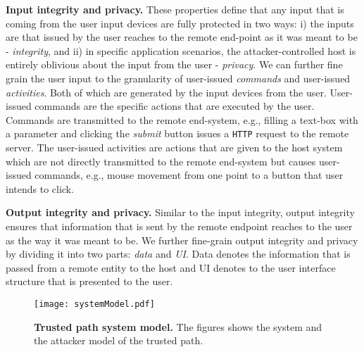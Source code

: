 \begin{mylist}
  \item \textbf{Input integrity and privacy.} These properties define that any input that is coming from the user input devices are fully protected in two ways: i) the inputs are that issued by the user reaches to the remote end-point as it was meant to be - \emph{integrity}, and ii) in specific application scenarios, the attacker-controlled host is entirely oblivious about the input from the user - \emph{privacy}. We can further fine grain the user input to the granularity of user-issued \emph{commands} and user-issued \emph{activities}. Both of which are generated by the input devices from the user. User-issued commands are the specific actions that are executed by the user. Commands are transmitted to the remote end-system, e.g., filling a text-box with a parameter and clicking the \emph{submit} button issues a \texttt{HTTP} request to the remote server. The user-issued activities are actions that are given to the host system which are not directly transmitted to the remote end-system but causes user-issued commands, e.g., mouse movement from one point to a button that user intends to click.  
  
  \item \textbf{Output integrity and privacy.} Similar to the input integrity, output integrity ensures that information that is sent by the remote endpoint reaches to the user as the way it was meant to be. We further fine-grain output integrity and privacy by dividing it into two parts: \emph{data} and \emph{UI}. Data denotes the information that is passed from a remote entity to the host and UI denotes to the user interface structure that is presented to the user.
  
  \end{mylist}

\begin{figure}[t]
\centering
\texttt{[image: systemModel.pdf]}
\caption{\textbf{Trusted path system model.} The figures shows the system and the attacker model of the trusted path.}
\label{fig:systemModel}
\centering
\end{figure}

\iffalse
\myparagraph{Advantages}

\begin{enumerate}
  \item The \device does not need to know the formatting/template of the page. As the \device only looks to the current mouse position, the structure of the page is somewhat irrelevant (?).
\end{enumerate}
\fi

